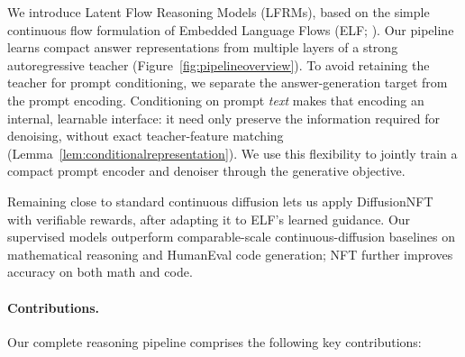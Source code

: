 \documentclass{article}
\begin{document}
We introduce Latent Flow Reasoning Models (LFRMs), based on the simple continuous flow formulation of Embedded Language Flows (ELF; \citealp{elf}). Our pipeline learns compact answer representations from multiple layers of a strong autoregressive teacher (Figure~\ref{fig:pipelineoverview}). To avoid retaining the teacher for prompt conditioning, we separate the answer-generation target from the prompt encoding. Conditioning on prompt \emph{text} makes that encoding an internal, learnable interface: it need only preserve the information required for denoising, without exact teacher-feature matching (Lemma~\ref{lem:conditionalrepresentation}). We use this flexibility to jointly train a compact prompt encoder and denoiser through the generative objective.

Remaining close to standard continuous diffusion lets us apply DiffusionNFT \citep{diffusionnft} with verifiable rewards, after adapting it to ELF's learned guidance. Our supervised models outperform comparable-scale continuous-diffusion baselines on mathematical reasoning and HumanEval code generation; NFT further improves accuracy on both math and code.

\paragraph{Contributions.}
\label{sec:contributions}

Our complete reasoning pipeline comprises the following key contributions:
\end{document}
